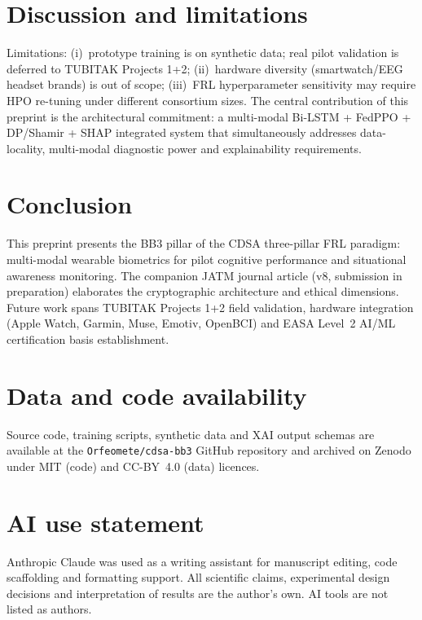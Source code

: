 \documentclass[11pt]{article}
\begin{document}
\section{Discussion and limitations}
Limitations: (i)~prototype training is on synthetic data; real pilot validation is deferred to TUBITAK Projects 1+2; (ii)~hardware diversity (smartwatch/EEG headset brands) is out of scope; (iii)~FRL hyperparameter sensitivity may require HPO re-tuning under different consortium sizes. The central contribution of this preprint is the architectural commitment: a multi-modal Bi-LSTM + FedPPO + DP/Shamir + SHAP integrated system that simultaneously addresses data-locality, multi-modal diagnostic power and explainability requirements.

\section{Conclusion}
This preprint presents the BB3 pillar of the CDSA three-pillar FRL paradigm: multi-modal wearable biometrics for pilot cognitive performance and situational awareness monitoring. The companion JATM journal article (v8, submission in preparation) elaborates the cryptographic architecture and ethical dimensions. Future work spans TUBITAK Projects 1+2 field validation, hardware integration (Apple Watch, Garmin, Muse, Emotiv, OpenBCI) and EASA Level~2 AI/ML certification basis establishment.

\section*{Data and code availability}
Source code, training scripts, synthetic data and XAI output schemas are available at the \texttt{Orfeomete/cdsa-bb3} GitHub repository and archived on Zenodo under MIT (code) and CC-BY~4.0 (data) licences.

\section*{AI use statement}
Anthropic Claude was used as a writing assistant for manuscript editing, code scaffolding and formatting support. All scientific claims, experimental design decisions and interpretation of results are the author's own. AI tools are not listed as authors.
\end{document}
